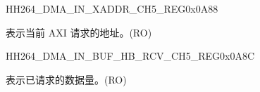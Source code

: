     
    \begin{register}{H}{H264\_DMA\_IN\_XADDR\_CH5\_REG}{0x0A88}\label{regdesc:H264DMAINXADDRCH5REG}
    \regnewline%
    \begin{regdesc}\begin{reglist}
    \label{fielddesc:H264DMAINCMDFIFOXADDRCH5}\item [H264\_DMA\_IN\_CMDFIFO\_XADDR\_CH5] 表示当前 AXI 请求的地址。(RO)
    \end{reglist}\end{regdesc}
    \end{register}
    
    
    \begin{register}{H}{H264\_DMA\_IN\_BUF\_HB\_RCV\_CH5\_REG}{0x0A8C}\label{regdesc:H264DMAINBUFHBRCVCH5REG}
    \regnewline%
    \begin{regdesc}\begin{reglist}
    \label{fielddesc:H264DMAINCMDFIFOBUFHBRCVCH5}\item [H264\_DMA\_IN\_CMDFIFO\_BUF\_HB\_RCV\_CH5] 表示已请求的数据量。(RO)
    \end{reglist}\end{regdesc}
    \end{register}
    
    
    
